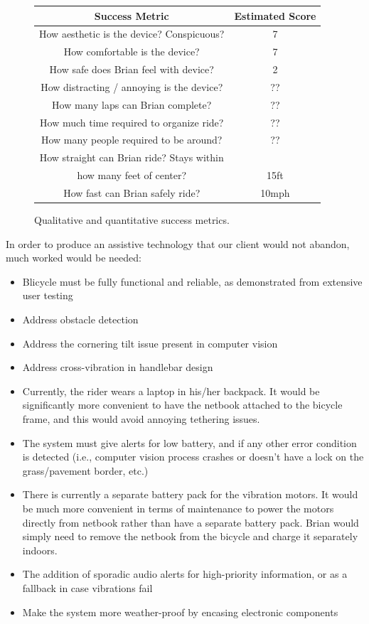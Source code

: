 \documentclass[aps,twocolumn,secnumarabic,balancelastpage,amsmath,amssymb,nofootinbib]{revtex4-1}
\begin{document}
\begin{figure}
\begin{tabular}{| c | c |}
\hline
Success Metric & Estimated Score \\ \hline \hline
How aesthetic is the device? Conspicuous? & 7 \\ \hline
How comfortable is the device? & 7 \\ \hline
How safe does Brian feel with device? & 2 \\ \hline
How distracting / annoying is the device? & ?? \\ \hline \hline
How many laps can Brian complete? & ?? \\ \hline
How much time required to organize ride? & ?? \\ \hline
How many people required to be around? & ?? \\ \hline
How straight can Brian ride? Stays within \\ how many feet of center? & 15ft \\ \hline
How fast can Brian safely ride? & 10mph \\ \hline
\end{tabular}
\caption{Qualitative and quantitative success metrics.}
\label{fig:SuccessMetricsEval}
\end{figure}


In order to produce an assistive technology that our client would not abandon, much worked would be needed:
\begin{itemize}
\item Blicycle must be fully functional and reliable, as demonstrated from extensive user testing
\item Address obstacle detection
\item Address the cornering tilt issue present in computer vision
\item Address cross-vibration in handlebar design
\item Currently, the rider wears a laptop in his/her backpack. It would be significantly more convenient to have the netbook attached to the bicycle frame, and this would avoid annoying tethering issues.
\item The system must give alerts for low battery, and if any other error condition is detected (i.e., computer vision process crashes or doesn't have a lock on the grass/pavement border, etc.)
\item There is currently a separate battery pack for the vibration motors. It would be much more convenient in terms of maintenance to power the motors directly from netbook rather than have a separate battery pack. Brian would simply need to remove the netbook from the bicycle and charge it separately indoors.
\item The addition of sporadic audio alerts for high-priority information, or as a fallback in case vibrations fail
\item Make the system more weather-proof by encasing electronic components
\end{itemize}
\end{document}
